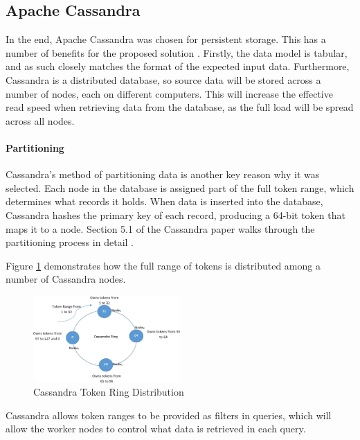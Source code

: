 \subsection{Apache Cassandra} 
In the end, Apache Cassandra was chosen for persistent storage. This has a number of benefits for the proposed solution \cite{lakshman2010cassandra}. Firstly, the data model is tabular, and as such closely matches the format of the expected input data. Furthermore, Cassandra is a distributed database, so source data will be stored across a number of nodes, each on different computers. This will increase the effective read speed when retrieving data from the database, as the full load will be spread across all nodes.

\paragraph{Partitioning} Cassandra's method of partitioning data is another key reason why it was selected. Each node in the database is assigned part of the full token range, which determines what records it holds. When data is inserted into the database, Cassandra hashes the primary key of each record, producing a 64-bit token that maps it to a node. Section 5.1 of the Cassandra paper walks through the partitioning process in detail \cite{lakshman2010cassandra}.

Figure \ref{fig:cassandra-token-distribution} demonstrates how the full range of tokens is distributed among a number of Cassandra nodes.

\begin{figure}[h]
	\centering
	\includegraphics[width=0.5\textwidth]{chapters/diagrams/design/cassandra-token-distribution}
	\caption{Cassandra Token Ring Distribution \protect\cite{khatibi2019dynamic}}
	\label{fig:cassandra-token-distribution}
\end{figure}

Cassandra allows token ranges to be provided as filters in queries, which will allow the worker nodes to control what data is retrieved in each query.

